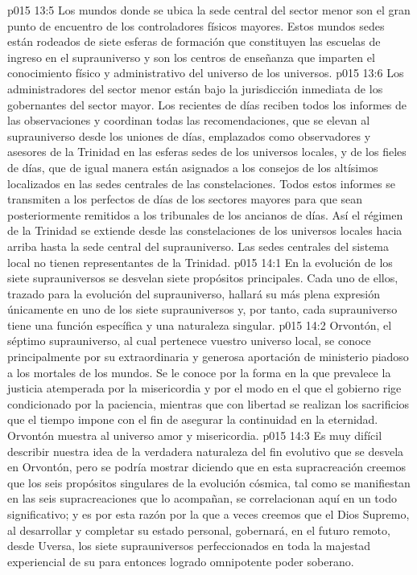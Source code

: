 \vs p015 13:5 Los mundos donde se ubica la sede central del sector menor son el gran punto de encuentro de los controladores físicos mayores. Estos mundos sedes están rodeados de siete esferas de formación que constituyen las escuelas de ingreso en el suprauniverso y son los centros de enseñanza que imparten el conocimiento físico y administrativo del universo de los universos.
\vs p015 13:6 Los administradores del sector menor están bajo la jurisdicción inmediata de los gobernantes del sector mayor. Los recientes de días reciben todos los informes de las observaciones y coordinan todas las recomendaciones, que se elevan al suprauniverso desde los uniones de días, emplazados como observadores y asesores de la Trinidad en las esferas sedes de los universos locales, y de los fieles de días, que de igual manera están asignados a los consejos de los altísimos localizados en las sedes centrales de las constelaciones. Todos estos informes se transmiten a los perfectos de días de los sectores mayores para que sean posteriormente remitidos a los tribunales de los ancianos de días. Así el régimen de la Trinidad se extiende desde las constelaciones de los universos locales hacia arriba hasta la sede central del suprauniverso. Las sedes centrales del sistema local no tienen representantes de la Trinidad.
\vs p015 14:1 En la evolución de los siete suprauniversos se desvelan siete propósitos principales. Cada uno de ellos, trazado para la evolución del suprauniverso, hallará su más plena expresión únicamente en uno de los siete suprauniversos y, por tanto, cada suprauniverso tiene una función específica y una naturaleza singular.
\vs p015 14:2 Orvontón, el séptimo suprauniverso, al cual pertenece vuestro universo local, se conoce principalmente por su extraordinaria y generosa aportación de ministerio piadoso a los mortales de los mundos. Se le conoce por la forma en la que prevalece la justicia atemperada por la misericordia y por el modo en el que el gobierno rige condicionado por la paciencia, mientras que con libertad se realizan los sacrificios que el tiempo impone con el fin de asegurar la continuidad en la eternidad. Orvontón muestra al universo amor y misericordia.
\vs p015 14:3 Es muy difícil describir nuestra idea de la verdadera naturaleza del fin evolutivo que se desvela en Orvontón, pero se podría mostrar diciendo que en esta supracreación creemos que los seis propósitos singulares de la evolución cósmica, tal como se manifiestan en las seis supracreaciones que lo acompañan, se correlacionan aquí en un todo significativo; y es por esta razón por la que a veces creemos que el Dios Supremo, al desarrollar y completar su estado personal, gobernará, en el futuro remoto, desde Uversa, los siete suprauniversos perfeccionados en toda la majestad experiencial de su para entonces logrado omnipotente poder soberano.
